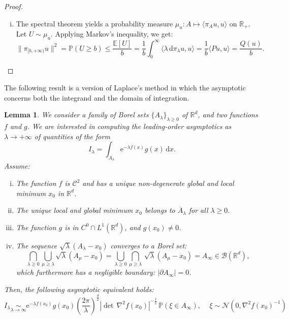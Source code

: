 \documentclass[10pt]{article}
\renewcommand{\d}{\mathrm{d}}
\newcommand{\e}{\mathrm{e}}
\newcommand{\R}{\mathbb{R}}
\newcommand{\1}{\mathbbm 1}
\newtheorem{lemma}{Lemma}
\begin{document}
\begin{proof}
\begin{enumerate}[i)]
{            }
            \item{
                The spectral theorem yields a probability measure $\mu_u : A \mapsto \langle \pi_A u,u\rangle$ on $\R_+$. Let $U\sim \mu_u$.
                Applying Markov's inequality, we get:
                \begin{equation}
                    \|\pi_{[b,+\infty)}u\|^2 = \mathbb P (U \geq b) \leq \frac{\mathbb E[U]}{b} = \frac1b\int_0^\infty \langle \lambda\,\d\pi_{\lambda}u,u\rangle = \frac1b\langle Pu,u\rangle = \frac{Q(u)}b.
                \end{equation}
            }
        \end{enumerate}        
    \end{proof}

    The following result is a version of Laplace's method in which the asymptotic concerns both the integrand and the domain of integration.
    \begin{lemma}
        We consider a family of Borel sets $\{A_\lambda\}_{\lambda\geq 0}$ of $\R^d$, and two functions $f$ and $g$.
        We are interested in computing the leading-order asymptotics as $\lambda\to+\infty$ of quantities of the form 
        $$I_\lambda = \int_{A_\lambda}\e^{-\lambda f(x)}g(x)\,\d x.$$
        Assume:
        \begin{enumerate}[i)]
            \item{\label{hyp:fc2}The function $f$ is $\mathcal C^2$ and has a unique non-degenerate global and local minimum $x_0$ in $\R^d$.}
            \item{\label{hyp:strong_min}The unique local and global minimum $x_0$ belongs to $\overline A_\lambda$ for all $\lambda\geq 0$.}
            \item{\label{hyp:gc0}The function $g$ is in $C^0\cap L^1 (\R^d)$, and $g(x_0)\neq 0$.}
            \item{\label{hyp:domain_conv}The sequence $\sqrt{\lambda}(A_\lambda - x_0)$ converges to a Borel set: $$\bigcap_{\lambda \geq 0} \bigcup_{\mu\geq\lambda} \sqrt{\lambda}(A_\mu-x_0) = \bigcup_{\lambda \geq 0} \bigcap_{\mu \geq \lambda}\, \sqrt\lambda ( A_\mu - x_0) = A_\infty \in \mathcal{B}(\R^d),$$
            which furthermore has a negligible boundary: $\left|\partial A_\infty \right|=0$.}
        \end{enumerate}
        Then, the following asymptotic equivalent holds:
        \begin{equation}
            \label{eq:laplace_method}
            I_\lambda \underset{\lambda\to\infty}{\sim} \e^{-\lambda f(x_0)}g(x_0)\left(\frac{2\pi}{\lambda}\right)^{\frac d2}\left|\det\,\nabla^2 f(x_0)\right|^{-\frac12}\,\mathbb{P}\left(\xi \in A_\infty\right),\quad\,{\xi\sim \mathcal N\left(0,\nabla^2 f(x_0)^{-1}\right)}
        \end{equation}
    \end{lemma}
\end{document}
